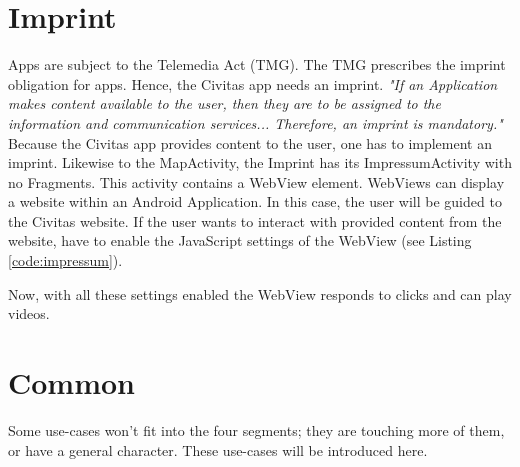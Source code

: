 

\section{Imprint}
Apps are subject to the Telemedia Act (TMG). The TMG prescribes the imprint obligation for apps. Hence, the Civitas app needs an imprint. \textit{"If an Application makes content available to the user, then they are to be assigned to the information and communication services... Therefore, an imprint is mandatory."} \citep[cf.]{impressum}
Because the Civitas app provides content to the user, one has to implement an imprint. 
Likewise to the MapActivity, the Imprint has its ImpressumActivity with no Fragments. This activity contains a WebView element. WebViews can display a website within an Android Application. In this case, the user will be guided to the Civitas website. If the user wants to interact with provided content from the website, have to enable the JavaScript settings of the WebView (see Listing \ref{code:impressum}).

\begin{mdframed}

\end{mdframed}

Now, with all these settings enabled the WebView responds to clicks and can play videos.



\section{Common}
Some use-cases won't fit into the four segments; they are touching more of them, or have a general character. These use-cases will be introduced here.

